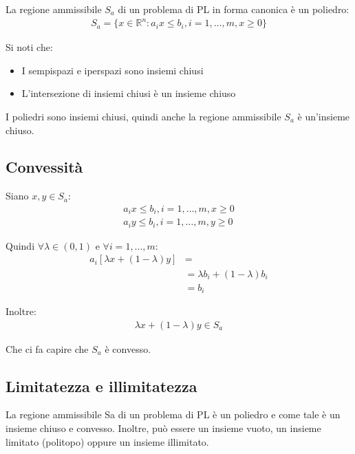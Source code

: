 La regione ammissibile $S_a$ di un problema di PL in forma canonica è un poliedro:
\begin{align}
	S_a = \{x \in \mathbb{R}^n : a_i x \leq b_i,  i = 1, \dots, m, x \geq 0 \}
\end{align}


Si noti che:
\begin{itemize}
	\item I sempispazi e iperspazi sono insiemi chiusi
	\item L'intersezione di insiemi chiusi è un insieme chiuso
\end{itemize}

I poliedri sono insiemi chiusi, quindi anche la regione ammissibile $S_a$ è un'insieme chiuso.


\subsection{Convessità}

Siano $x, y \in S_a$:
\begin{align}
	a_i x \leq b_i,  i = 1, \dots, m, x \geq 0 \\
	a_i y \leq b_i,  i = 1, \dots, m, y \geq 0
\end{align}


Quindi $\forall \lambda \in (0,1)$ e $\forall i = 1, \dots, m$:
\begin{align}
	a_i [\lambda x + (1-\lambda) y] & =                               \\
	                                & = \lambda b_i + (1-\lambda) b_i \\
	                                & = b_i
\end{align}



Inoltre:
\begin{align}
	\lambda x + (1-\lambda) y \in S_a
\end{align}

Che ci fa capire che $S_a$ è convesso.


\subsection{Limitatezza e illimitatezza}


La regione ammissibile Sa di un problema di PL è un poliedro e come tale è un insieme chiuso e convesso. Inoltre, può essere un insieme vuoto, un insieme limitato (politopo) oppure un insieme illimitato.


